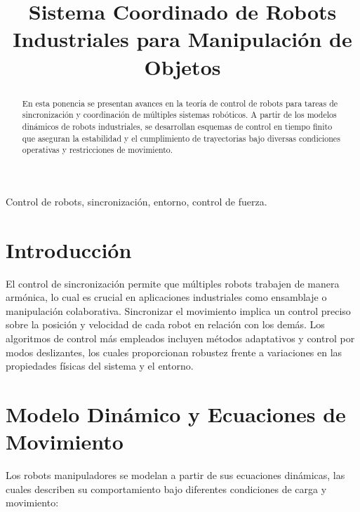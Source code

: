 \documentclass[conference]{IEEEtran}
\begin{document}
\title{Sistema Coordinado de Robots Industriales para Manipulación de Objetos\\
}

\author{
	\and
}

\maketitle

\begin{abstract}
	En esta ponencia se presentan avances en la teoría de control de robots para tareas de sincronización y coordinación de múltiples sistemas robóticos. A partir de los modelos dinámicos de robots industriales, se desarrollan esquemas de control en tiempo finito que aseguran la estabilidad y el cumplimiento de trayectorias bajo diversas condiciones operativas y restricciones de movimiento.
\end{abstract}

\begin{IEEEkeywords}
	Control de robots, sincronización, entorno, control de fuerza.
\end{IEEEkeywords}

\section*{Introducción}
El control de sincronización permite que múltiples robots trabajen de manera armónica, lo cual es crucial en aplicaciones industriales como ensamblaje o manipulación colaborativa. Sincronizar el movimiento implica un control preciso sobre la posición y velocidad de cada robot en relación con los demás. Los algoritmos de control más empleados incluyen métodos adaptativos y control por modos deslizantes, los cuales proporcionan robustez frente a variaciones en las propiedades físicas del sistema y el entorno.

\section*{Modelo Dinámico y Ecuaciones de Movimiento}
Los robots manipuladores se modelan a partir de sus ecuaciones dinámicas, las cuales describen su comportamiento bajo diferentes condiciones de carga y movimiento:
\end{document}
